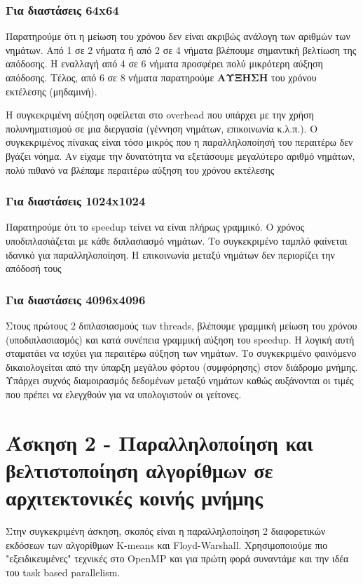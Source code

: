 \documentclass[letterpaper,12pt]{article}
\begin{document}
\subsubsection*{Για διαστάσεις 64x64}

Παρατηρούμε ότι η μείωση του χρόνου δεν είναι ακριβώς ανάλογη των αριθμών των νημάτων. Από 1 σε 2 νήματα ή από 2 σε 4 νήματα βλέπουμε σημαντική βελτίωση της απόδοσης. Η εναλλαγή από 4 σε 6 νήματα προσφέρει πολύ μικρότερη αύξηση απόδοσης. Τέλος, από 6 σε 8 νήματα παρατηρούμε \textbf{ΑΥΞΗΣΗ} του χρόνου εκτέλεσης (μηδαμινή). 

Η συγκεκριμένη αύξηση οφείλεται στο overhead που υπάρχει με την χρήση πολυνηματισμού σε μια διεργασία (γέννηση νημάτων, επικοινωνία κ.λ.π.). Ο συγκεκριμένος πίνακας είναι τόσο μικρός που η παραλληλοποίησή του περαιτέρω δεν βγάζει νόημα. Αν είχαμε την δυνατότητα να εξετάσουμε μεγαλύτερο αριθμό νημάτων, πολύ πιθανό να βλέπαμε περαιτέρω αύξηση του χρόνου εκτέλεσης
\subsubsection*{Για διαστάσεις 1024x1024}

Παρατηρούμε ότι το speedup τείνει να είναι πλήρως γραμμικό. Ο χρόνος υποδιπλασιάζεται με κάθε διπλασιασμό νημάτων. Το συγκεκριμένο ταμπλό φαίνεται ιδανικό για παραλληλοποίηση. Η επικοινωνία μεταξύ νημάτων δεν περιορίζει την απόδοσή τους
\subsubsection*{Για διαστάσεις 4096x4096}

Στους πρώτους 2 διπλασιασμούς των threads, βλέπουμε γραμμική μείωση του χρόνου (υποδιπλασιασμός) και κατά συνέπεια γραμμική αύξηση του speedup. Η λογική αυτή σταματάει να ισχύει για περαιτέρω αύξηση των νημάτων. Το συγκεκριμένο φαινόμενο δικαιολογείται από την ύπαρξη μεγάλου φόρτου (συμφόρησης) στον διάδρομο μνήμης. Υπάρχει συχνός διαμοιρασμός δεδομένων μεταξύ νημάτων καθώς αυξάνονται οι τιμές που πρέπει να ελεγχθούν για να υπολογιστούν οι γείτονες.


\section{Άσκηση 2 - Παραλληλοποίηση και βελτιστοποίηση αλγορίθμων σε αρχιτεκτονικές κοινής μνήμης}

Στην συγκεκριμένη άσκηση, σκοπός είναι η παραλληλοποίηση 2 διαφορετικών εκδόσεων των αλγορίθμων K-means και Floyd-Warshall.
Χρησιμοποιούμε πιο "εξειδικευμένες" τεχνικές στο OpenMP και για πρώτη φορά συναντάμε και την ιδέα του task based parallelism.
\end{document}
